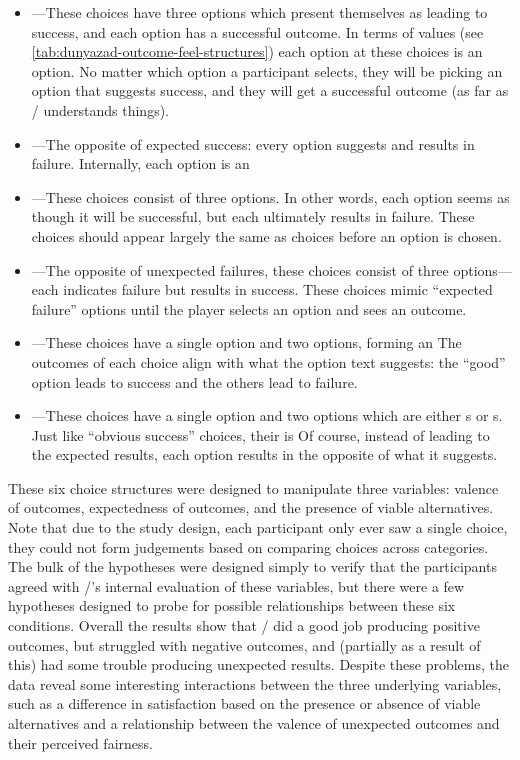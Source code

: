 \begin{itemize}
  \item {}---These choices have three options which present themselves as leading to success, and each option has a successful outcome. In terms of  values (see \cref{tab:dunyazad-outcome-feel-structures}) each option at these choices is an \exps option. No matter which option a participant selects, they will be picking an option that suggests success, and they will get a successful outcome (as far as \dunyazad/ understands things).
  \item {}---The opposite of expected success: every option suggests and results in failure. Internally, each option is an 
  \item {}---These choices consist of three  options. In other words, each option seems as though it will be successful, but each ultimately results in failure. These choices should appear largely the same as \exps{} choices before an option is chosen.
  \item {}---The opposite of unexpected failures, these choices consist of three  options---each indicates failure but results in success. These choices mimic ``expected failure'' options until the player selects an option and sees an outcome.
  \item {}---These choices have a single \exps{} option and two \expf{} options, forming an \obv{}  The outcomes of each choice align with what the option text suggests: the ``good'' option leads to success and the others lead to failure.
  \item {}---These choices have a single  option and two options which are either s or s. Just like ``obvious success'' choices, their  is  Of course, instead of leading to the expected results, each option results in the opposite of what it suggests.
\end{itemize}

These six choice structures were designed to manipulate three variables: valence of outcomes, expectedness of outcomes, and the presence of viable alternatives.
%
Note that due to the study design, each participant only ever saw a single choice, they could not form judgements based on comparing choices across categories.
%
The bulk of the hypotheses were designed simply to verify that the participants agreed with \dunyazad/'s internal evaluation of these variables, but there were a few hypotheses designed to probe for possible relationships between these six conditions.
%
Overall the results show that \dunyazad/ did a good job producing positive outcomes, but struggled with negative outcomes, and (partially as a result of this) had some trouble producing unexpected results.
%
Despite these problems, the data reveal some interesting interactions between the three underlying variables, such as a difference in satisfaction based on the presence or absence of viable alternatives and a relationship between the valence of unexpected outcomes and their perceived fairness.



